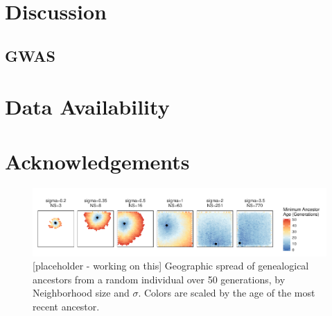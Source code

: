 \documentclass[9pt,twocolumn,twoside,lineno]{gsajnl}
\begin{document}
\section{Discussion}

\subsection{GWAS}



\section{Data Availability}

\section{Acknowledgements}

\begin{figure}[p]
\centering
\includegraphics[width=\textwidth]{min_ancestor_age_maps.pdf}
\caption{[placeholder - working on this] Geographic spread of genealogical ancestors from a random individual over 50 generations, by Neighborhood size and $\sigma$. Colors are scaled by the age of the most recent ancestor.}
\label{fig:spectrum}
\end{figure}
\end{document}
